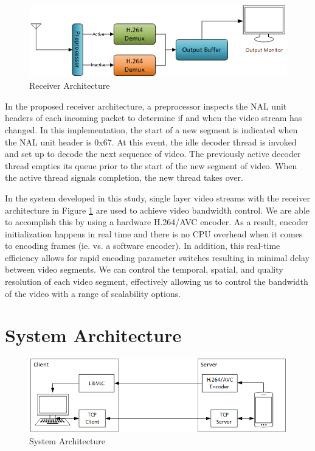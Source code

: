 \documentclass[3p,times,procedia]{elsarticle}
\begin{document}
\begin{figure}[ht]
\centering
\includegraphics[width=0.6\linewidth]{ReceiverArchitecture.png}
\caption{Receiver Architecture}
\label{fig:ReceiverArchitecture}
\end{figure}
In the proposed receiver architecture, a preprocessor inspects the NAL unit headers of each incoming packet to determine if and when the video stream has changed. In this implementation, the start of a new segment is indicated when the NAL unit header is 0x67. At this event, the idle decoder thread is invoked and set up to decode the next sequence of video. The previously active decoder thread empties its queue prior to the start of the new segment of video. When the active thread signals completion, the new thread takes over.

In the system developed in this study, single layer video streams with the receiver architecture in Figure \ref{fig:ReceiverArchitecture} are used to achieve video bandwidth control. We are able to accomplish this by using a hardware H.264/AVC encoder. As a result, encoder initialization happens in real time and there is no CPU overhead when it comes to encoding frames (ie. vs. a software encoder). In addition, this real-time efficiency allows for rapid encoding parameter switches resulting in minimal delay between video segments. We can control the temporal, spatial, and quality resolution of each video segment, effectively allowing us to control the bandwidth of the video with a range of scalability options. 


\section{System Architecture}
\label{sec:Architecture}
\begin{figure}[ht]
\centering
\includegraphics[width=0.7\linewidth]{SystemArchitecture.png}
\caption{System Architecture}
\label{fig:SystemArchitecture}
\end{figure}
\end{document}
